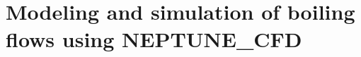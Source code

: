 \pagestyle{scrheadings} %

\cleardoublepage %

\cleardoublepage


\cleardoublepage %






\cleardoublepage %







\part{Modeling and simulation of boiling flows using NEPTUNE\_CFD} %

